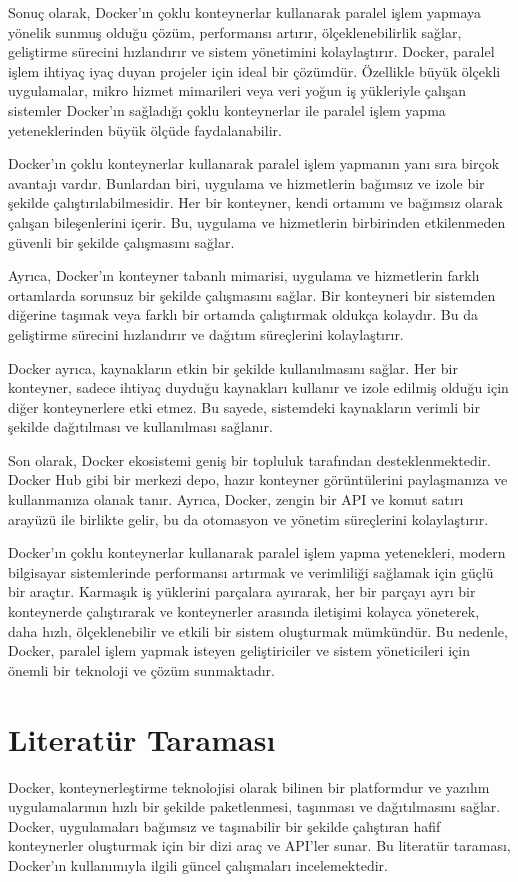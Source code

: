 Sonuç olarak, Docker'ın çoklu konteynerlar kullanarak paralel işlem yapmaya yönelik sunmuş olduğu çözüm, performansı artırır, ölçeklenebilirlik sağlar, geliştirme sürecini hızlandırır ve sistem yönetimini kolaylaştırır. 
Docker, paralel işlem  ihtiyaç iyaç duyan projeler için ideal bir çözümdür. Özellikle büyük ölçekli uygulamalar, mikro hizmet mimarileri veya veri yoğun iş yükleriyle çalışan sistemler Docker'ın sağladığı çoklu konteynerlar ile paralel işlem yapma yeteneklerinden büyük ölçüde faydalanabilir.

Docker'ın çoklu konteynerlar kullanarak paralel işlem yapmanın yanı sıra birçok avantajı vardır. Bunlardan biri, uygulama ve hizmetlerin bağımsız ve izole bir şekilde çalıştırılabilmesidir. Her bir konteyner, kendi ortamını ve bağımsız olarak çalışan bileşenlerini içerir. Bu, uygulama ve hizmetlerin birbirinden etkilenmeden güvenli bir şekilde çalışmasını sağlar.

Ayrıca, Docker'ın konteyner tabanlı mimarisi, uygulama ve hizmetlerin farklı ortamlarda sorunsuz bir şekilde çalışmasını sağlar. Bir konteyneri bir sistemden diğerine taşımak veya farklı bir ortamda çalıştırmak oldukça kolaydır. Bu da geliştirme sürecini hızlandırır ve dağıtım süreçlerini kolaylaştırır.

Docker ayrıca, kaynakların etkin bir şekilde kullanılmasını sağlar. Her bir konteyner, sadece ihtiyaç duyduğu kaynakları kullanır ve izole edilmiş olduğu için diğer konteynerlere etki etmez. Bu sayede, sistemdeki kaynakların verimli bir şekilde dağıtılması ve kullanılması sağlanır.

Son olarak, Docker ekosistemi geniş bir topluluk tarafından desteklenmektedir. Docker Hub gibi bir merkezi depo, hazır konteyner görüntülerini paylaşmanıza ve kullanmanıza olanak tanır. Ayrıca, Docker, zengin bir API ve komut satırı arayüzü ile birlikte gelir, bu da otomasyon ve yönetim süreçlerini kolaylaştırır.

Docker'ın çoklu konteynerlar kullanarak paralel işlem yapma yetenekleri, modern bilgisayar sistemlerinde performansı artırmak ve verimliliği sağlamak için güçlü bir araçtır. Karmaşık iş yüklerini parçalara ayırarak, her bir parçayı ayrı bir konteynerde çalıştırarak ve konteynerler arasında iletişimi kolayca yöneterek, daha hızlı, ölçeklenebilir ve etkili bir sistem oluşturmak mümkündür. Bu nedenle, Docker, paralel işlem yapmak isteyen geliştiriciler ve sistem yöneticileri için önemli bir teknoloji ve çözüm sunmaktadır.
\section{Literatür Taraması}
Docker, konteynerleştirme teknolojisi olarak bilinen bir platformdur ve yazılım uygulamalarının hızlı bir şekilde paketlenmesi, taşınması ve dağıtılmasını sağlar. Docker, uygulamaları bağımsız ve taşınabilir bir şekilde çalıştıran hafif konteynerler oluşturmak için bir dizi araç ve API'ler sunar. Bu literatür taraması, Docker'ın kullanımıyla ilgili güncel çalışmaları incelemektedir.\\
